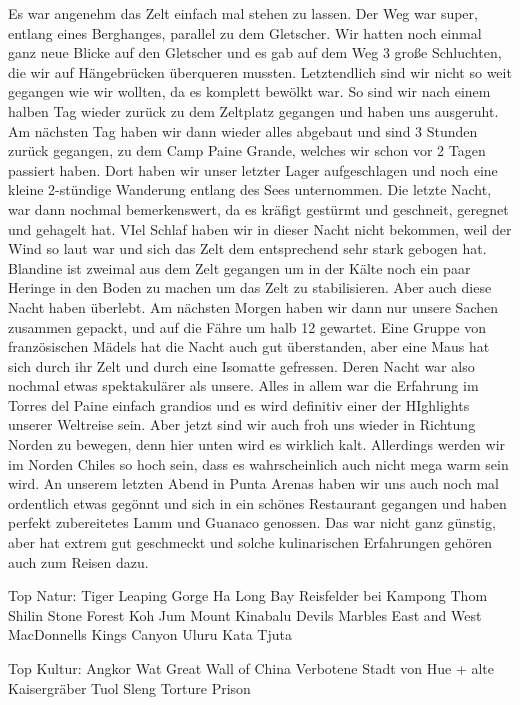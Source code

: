\documentclass[11pt]{book}
\begin{document}
Es war angenehm das Zelt einfach mal stehen zu lassen. Der Weg war super, entlang eines Berghanges, parallel zu dem Gletscher. Wir hatten 
noch einmal ganz neue Blicke auf den Gletscher und es gab auf dem Weg 3 große Schluchten, die wir auf Hängebrücken überqueren mussten. 
Letztendlich sind wir nicht so weit gegangen wie wir wollten, da es komplett bewölkt war. So sind wir nach einem halben Tag wieder 
zurück zu dem Zeltplatz gegangen und haben uns ausgeruht. 
Am nächsten Tag haben wir dann wieder alles abgebaut und sind 3 Stunden zurück gegangen, zu dem Camp Paine Grande, welches wir schon 
vor 2 Tagen passiert haben. Dort haben wir unser letzter Lager aufgeschlagen und noch eine kleine 2-stündige Wanderung entlang des Sees 
unternommen. Die letzte Nacht, war dann nochmal bemerkenswert, da es kräfigt gestürmt und geschneit, geregnet und gehagelt hat. VIel 
Schlaf haben wir in dieser Nacht nicht bekommen, weil der Wind so laut war und sich das Zelt dem entsprechend sehr stark gebogen hat. 
Blandine ist zweimal aus dem Zelt gegangen um in der Kälte noch ein paar Heringe in den Boden zu machen um das Zelt zu stabilisieren. 
Aber auch diese Nacht haben überlebt. Am nächsten Morgen haben wir dann nur unsere Sachen zusammen gepackt, und auf die Fähre um halb 
12 gewartet. Eine Gruppe von französischen Mädels hat die Nacht auch gut überstanden, aber eine Maus hat sich durch ihr Zelt und durch 
eine Isomatte gefressen. Deren Nacht war also nochmal etwas spektakulärer als unsere. 
Alles in allem war die Erfahrung im Torres del Paine einfach grandios und es wird definitiv einer der HIghlights unserer Weltreise sein. 
Aber jetzt sind wir auch froh uns wieder in Richtung Norden zu bewegen, denn hier unten wird es wirklich kalt. Allerdings werden 
wir im Norden Chiles so hoch sein, dass es wahrscheinlich auch nicht mega warm sein wird. 
An unserem letzten Abend in Punta Arenas haben wir uns auch noch mal ordentlich etwas gegönnt und sich in ein schönes Restaurant gegangen 
und haben perfekt zubereitetes Lamm und Guanaco genossen. Das war nicht ganz günstig, aber hat extrem gut geschmeckt und solche 
kulinarischen Erfahrungen gehören auch zum Reisen dazu. 





Top Natur:
Tiger Leaping Gorge
Ha Long Bay
Reisfelder bei Kampong Thom
Shilin Stone Forest
Koh Jum
Mount Kinabalu
Devils Marbles
East and West MacDonnells
Kings Canyon
Uluru
Kata Tjuta


Top Kultur:
Angkor Wat
Great Wall of China
Verbotene Stadt von Hue + alte Kaisergräber 
Tuol Sleng Torture Prison
\end{document}
